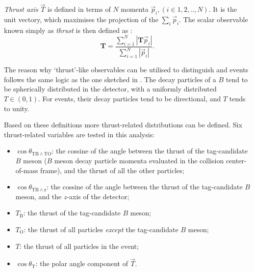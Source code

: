 \textit{Thrust axis} $\vec{T}$ is defined in terms of $N$ momenta $\vec{p}_i,(i\in{1,2,..,N})$.
It is the unit vectory, which maximises the projection of the $\sum_i\vec{p}_i$.
The scalar observable known simply as \textit{thrust} is then defined as \cite{BaBar:2014omp}:
\begin{equation}\label{eq:thrust}
    \mathbf{T} = \frac{\sum^N_{i=1}|\mathbf{T}\vec{p}_i|}{\sum^N_{i=1}|\vec{p}_i|}.
\end{equation}

The reason why `thrust'-like observables can be utilised to distinguish \epem\ra\qqbar and \BtoXsgamma events follows the same logic as the one sketched in .
The decay particles of a $B$ tend to be spherically distributed in the detector, with a uniformly distributed $T\in(0,1)$.
For \qqbar events, their decay particles tend to be directional, and $T$ tends to unity.

Based on these definitions more thrust-related distributions can be defined.
Six thrust-related variables are tested in this analysis:
\begin{itemize}
    \item $\cos\theta_{\mathrm{TB}\wedge\mathrm{TO}}$: the cossine of the angle between the thrust of the tag-candidate $B$ meson ($B$ meson decay particle momenta evaluated in the collision center-of-mass frame),
    and the thrust of all the other particles;
    \item $\cos\theta_{\mathrm{TB}\wedge\mathrm{z}}$: the cossine of the angle between the thrust of the tag-candidate $B$ meson,
    and the $z$-axis of the detector;
    \item $T_{\mathrm{B}}$: the thrust of the tag-candidate $B$ meson;
    \item $T_{\mathrm{O}}$: the thrust of all particles \textit{except} the tag-candidate $B$ meson;
    \item $T$: the thrust of all particles in the event;
    \item $\cos\theta_{\mathrm{T}}$: the polar angle component of $\vec{T}$.
\end{itemize}

